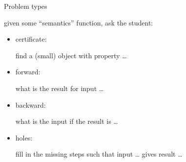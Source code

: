 \begin{slide}{Problem types}

given some ``semantics'' function, ask the student:
  \begin{itemize}
  \item certificate:
    
    find a (small) object with property \dots

  \item forward: 

    what is the result for input \dots

  \item backward:

    what is the input if the result is \dots

  \item holes:

    fill in the missing steps such that input \dots
    gives result \dots

  \end{itemize}

\end{slide}
